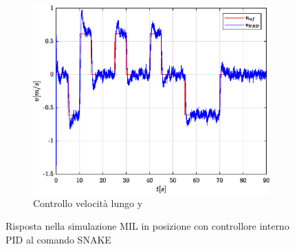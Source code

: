 \begin{figure}
\begin{subfigure}{0.45\textwidth}
		\includegraphics[width=1\textwidth]{Simulazioni/Figure/PID/SNAKE_MIL/PositionControlYVel}
		\caption{Controllo velocità lungo y}
	\end{subfigure}
	\caption{Risposta nella simulazione MIL in posizione con controllore interno PID al comando SNAKE}
\end{figure}

